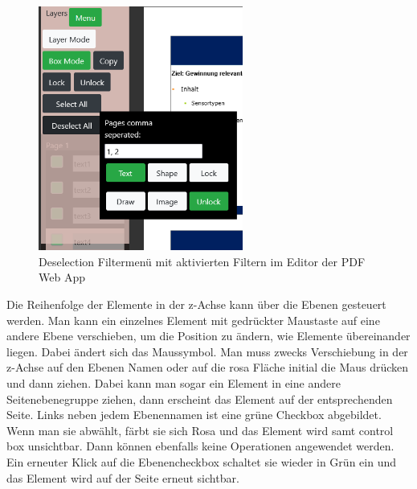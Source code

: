 \begin{figure}[!htbp]
	\centering
	\includegraphics[width=0.6\textwidth]{"images/filtering.png"}
	\caption{Deselection Filtermenü mit aktivierten Filtern im Editor der PDF Web App}
	\label{fig:filtering}
\end{figure}

Die Reihenfolge der Elemente in der z-Achse kann über die Ebenen gesteuert werden. Man kann ein einzelnes Element mit gedrückter Maustaste auf eine andere Ebene verschieben, um die Position zu ändern, wie Elemente übereinander liegen. Dabei ändert sich das Maussymbol. Man muss zwecks Verschiebung in der z-Achse auf den Ebenen Namen oder auf die rosa Fläche initial die Maus drücken und dann ziehen. Dabei kann man sogar ein Element in eine andere Seitenebenegruppe ziehen, dann erscheint das Element auf der entsprechenden Seite. Links neben jedem Ebenennamen ist eine grüne Checkbox abgebildet. Wenn man sie abwählt, färbt sie sich Rosa und das Element wird samt control box unsichtbar. Dann können ebenfalls keine Operationen angewendet werden. Ein erneuter Klick auf die Ebenencheckbox schaltet sie wieder in Grün ein und das Element wird auf der Seite erneut sichtbar. 


